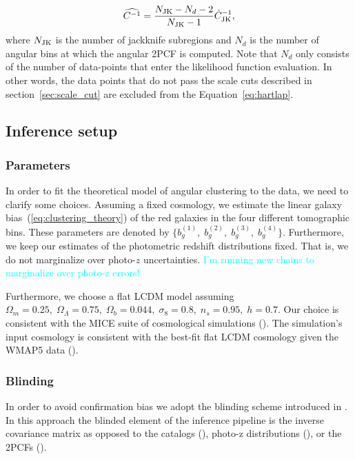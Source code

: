 \documentclass[fleqn,usenatbib,useAMS]{mnras}
\newcommand{\mjv}{\textcolor{cyan}}
\newcommand{\be}{\begin{equation}}
\newcommand{\ee}{\end{equation}}
\newcommand{\njk}{N_{\rm JK}}
\begin{document}
\be
\widehat{C^{-1}} = \frac{\njk - N_{d} - 2}{\njk - 1} \hat{C}^{-1}_{\rm JK},
\label{eq:hartlap}
\ee
where $\njk$ is the number of jackknife subregions and $N_{d}$ is the number of angular bins at which the angular 2PCF is computed. Note that $N_d$ only consists of the number of data-points that enter the likelihood function evaluation. In other words, the data points that do not pass the scale cuts described in section~\ref{sec:scale_cut} are excluded from the Equation~\ref{eq:hartlap}.  

\subsection{Inference setup}

\subsubsection{Parameters}

In order to fit the theoretical model of angular clustering to the data, we need to clarify some choices. Assuming a fixed cosmology, we estimate the linear galaxy bias~(\ref{eq:clustering_theory}) of the red galaxies in the four different tomographic bins. These parameters are denoted by $\{b^{(1)}_g, \; b^{(2)}_g, \; b^{(3)}_g, \; b^{(4)}_g\}$. Furthermore, we keep our estimates of the photometric redshift distributions fixed. That is, we do not marginalize over photo-$z$ uncertainties. 
\mjv{I'm running new chains to marginalize over photo-z errors!}

Furthermore, we choose a flat LCDM model assuming $\Omega_m = 0.25, \;\Omega_{\Lambda} = 0.75, \; \Omega_b = 0.044, \; \sigma_{8} = 0.8, \; n_s = 0.95, \; h = 0.7$. Our choice is consistent with the MICE suite of cosmological simulations (\citealt{MICE1}). The simulation's input cosmology is consistent with the best-fit flat LCDM cosmology given the WMAP5 data (\citealt{WMAP5}). 


\subsubsection{Blinding}

In order to avoid confirmation bias we adopt the blinding scheme introduced in \citep{sellentin2019}. In this approach the blinded element of the inference pipeline is the inverse covariance matrix as opposed to the catalogs (\citealt{hendrick2017}), photo-z distributions (\citealt{hendrik2018}), or the 2PCFs (\citealt{muir2019}). 
\end{document}
